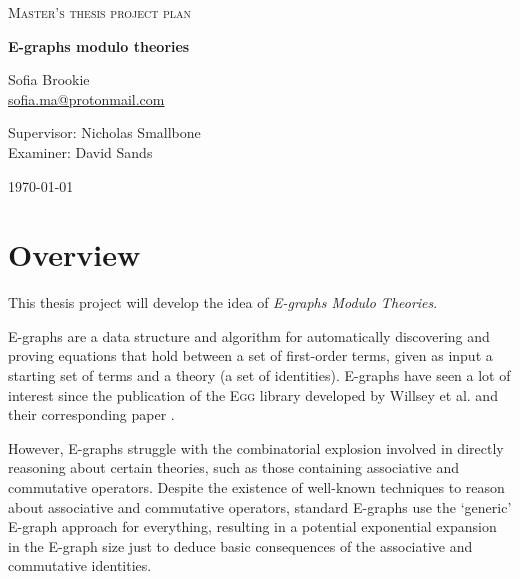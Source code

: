 \documentclass{article}
\theoremstyle{definition}
\begin{document}
\begin{titlepage}

\centering
  
{\scshape\LARGE Master's thesis project plan\\}
  
\vspace{0.5cm}
  
{\huge\bfseries E-graphs modulo theories\\}
  
\vspace{2cm}
  
{\Large Sofia Brookie \\ \href{mailto:sofia.ma@protonmail.com}{sofia.ma@protonmail.com} \\}
  
\vspace{1.0cm}
  
{\large Supervisor: Nicholas Smallbone\\}
{\large Examiner: David Sands\\}

\vfill

\vfill
  
{\large \today\\} 

\end{titlepage}

\section{Overview}
This thesis project will develop the idea of \textit{E-graphs Modulo Theories}.

E-graphs are a data structure and algorithm for automatically discovering and proving equations that hold
between a set of first-order terms, given as input a starting set of terms and a theory (a set of identities). E-graphs have seen a lot of interest since the publication of the \textsc{Egg} library developed by Willsey et al. and their corresponding paper \cite{willsey2021egg}.

However, E-graphs struggle with the combinatorial explosion involved in directly reasoning about certain theories, such as those containing associative and commutative operators. Despite the existence of well-known techniques to reason about associative and commutative operators, standard E-graphs use the `generic' E-graph approach for everything, resulting in a potential exponential expansion in the E-graph size just to deduce basic consequences of the associative and commutative identities.
\end{document}
